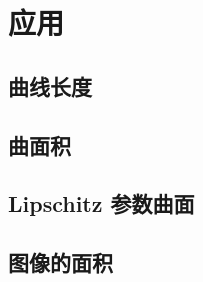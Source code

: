 \section{应用}
\label{b1:sec:1704}


\subsection{曲线长度}
\label{b1:subsec:170401}

\subsection{曲面积}
\label{b1:subsec:170402}

\subsection{Lipschitz 参数曲面}
\label{b1:subsec:170403}

\subsection{图像的面积}
\label{b1:subsec:170404}


